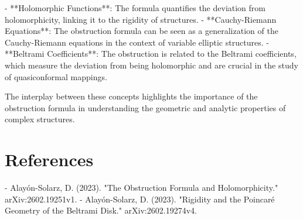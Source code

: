 \documentclass[11pt,a4paper]{article}
\begin{document}
- **Holomorphic Functions**: The formula quantifies the deviation from holomorphicity, linking it to the rigidity of structures.
- **Cauchy-Riemann Equations**: The obstruction formula can be seen as a generalization of the Cauchy-Riemann equations in the context of variable elliptic structures.
- **Beltrami Coefficients**: The obstruction is related to the Beltrami coefficients, which measure the deviation from being holomorphic and are crucial in the study of quasiconformal mappings.

The interplay between these concepts highlights the importance of the obstruction formula in understanding the geometric and analytic properties of complex structures.

\section{References}
- Alayón-Solarz, D. (2023). "The Obstruction Formula and Holomorphicity." arXiv:2602.19251v1.
- Alayón-Solarz, D. (2023). "Rigidity and the Poincaré Geometry of the Beltrami Disk." arXiv:2602.19274v4.
\end{document}
